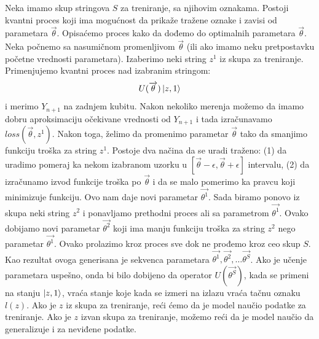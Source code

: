 \documentclass[12pt, letterpaper, oneside]{article}
\begin{document}
Neka imamo skup stringova \(S\) za treniranje, sa njihovim oznakama. Postoji kvantni proces koji ima mogućnost da
prikaže tražene oznake i zavisi od parametara $\overrightarrow{\theta}$. Opisaćemo proces kako da dođemo do optimalnih parametara $\overrightarrow{\theta}$.
Neka počnemo sa nasumičnom promenljivom $\overrightarrow{\theta}$ (ili ako imamo neku pretpostavku početne vrednosti parametara). Izaberimo neki string $z^1$ iz skupa za treniranje.
Primenjujemo kvantni proces nad izabranim stringom:
\[
    U(\overrightarrow{\theta})\Ket{z,1}
\] 
i merimo $Y_{n+1}$ na zadnjem kubitu. Nakon nekoliko merenja možemo da imamo dobru aproksimaciju očekivane vrednosti od $Y_{n+1}$
i tada izračunavamo $\mathit{loss}(\overrightarrow{\theta},z^1)$. Nakon toga, želimo da promenimo parametar $\overrightarrow{\theta}$ tako da smanjimo
funkciju troška za string $z^1$. Postoje dva načina da se uradi traženo: (1) da uradimo pomeraj ka nekom izabranom uzorku u $[\overrightarrow{\theta}-\epsilon,\overrightarrow{\theta}+\epsilon]$ intervalu,
(2) da izračunamo izvod funkcije troška po $\overrightarrow{\theta}$ i da se malo pomerimo ka pravcu koji minimizuje funkciju.
Ovo nam daje novi parametar $\overrightarrow{\theta^1}$. Sada biramo ponovo iz skupa neki string $z^2$ i ponavljamo prethodni proces ali sa parametrom $\overrightarrow{\theta^1}$.
Ovako dobijamo novi parametar $\overrightarrow{\theta^2}$ koji ima manju funkciju troška za string $z^2$ nego parametar $\overrightarrow{\theta^1}$.
Ovako prolazimo kroz proces sve dok ne prođemo kroz ceo skup $S$. Kao rezultat ovoga generisana je sekvenca parametara $\overrightarrow{\theta^1}, \overrightarrow{\theta^2}, \dots \overrightarrow{\theta^S}$.
Ako je učenje parametara uspešno, onda bi bilo dobijeno da operator $U(\overrightarrow{\theta^S})$, kada se primeni na stanju $\Ket{z,1}$, vraća stanje koje kada se izmeri na izlazu vraća tačnu oznaku $l(z)$.
Ako je $z$ iz skupa za treniranje, reći ćemo da je model naučio podatke za treniranje. Ako je $z$ izvan skupa za treniranje, možemo reći da je model naučio da generalizuje i za neviđene podatke.
\end{document}
